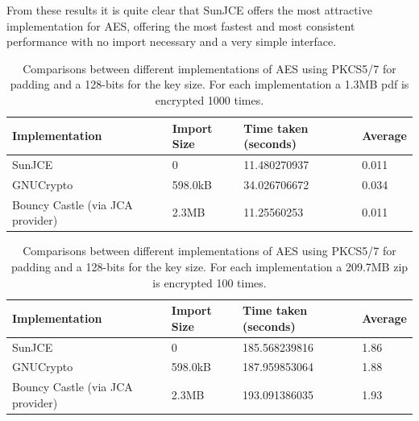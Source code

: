 \documentclass[12pt, titlepage]{article}
\begin{document}
\newline \indent From these results it is quite clear that SunJCE offers the most attractive implementation for AES, offering the most fastest and most consistent performance with no import necessary and a very simple interface.
\begin{center}
\begin{table}
    \begin{tabular}{ | l | l | l | l |}
    \hline
    Implementation & Import Size & Time taken (seconds) & Average \\ \hline
    
    SunJCE & 0 & 11.480270937  &  0.011 \\ \hline
    
    GNUCrypto & 598.0kB & 34.026706672  & 0.034 \\ \hline
    
    Bouncy Castle (via JCA provider) & 2.3MB & 11.25560253 & 0.011 \\ \hline
    
    \end{tabular}
    \caption{Comparisons between different implementations of AES using PKCS5/7 for padding and a 128-bits for the key size. For each implementation a 1.3MB pdf is encrypted 1000 times.} \label{tab:aespdfComparison}
    \end{table}
\end{center}

\begin{center}
\begin{table}
    \begin{tabular}{ | l | l | l | l |}
    \hline
    Implementation & Import Size & Time taken (seconds) & Average \\ \hline
    
    SunJCE & 0 & 185.568239816 & 1.86 \\ \hline
    
    GNUCrypto & 598.0kB & 187.959853064 & 1.88 \\ \hline
    
    Bouncy Castle (via JCA provider) & 2.3MB & 193.091386035 & 1.93 \\ \hline
    
    \end{tabular}
    \caption{Comparisons between different implementations of AES using PKCS5/7 for padding and a 128-bits for the key size. For each implementation a 209.7MB zip is encrypted 100 times.} \label{tab:aeszipComparison}
    \end{table}
\end{center}
\end{document}
